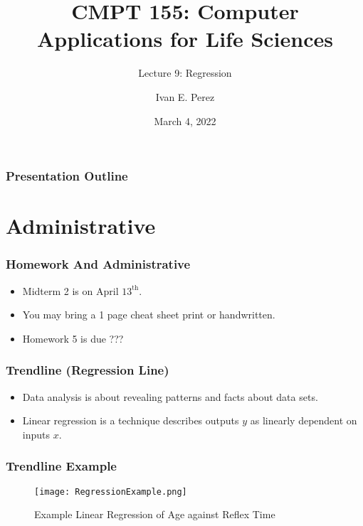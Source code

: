 \documentclass[12pt]{beamer}
\title{CMPT 155: Computer Applications for Life Sciences}
\subtitle{Lecture 9:  Regression}
\author{Ivan E. Perez}
\date{March 4, 2022}
\begin{document}
	
	\begin{frame}
		\titlepage
	\end{frame}
	
	\begin{frame}
		\frametitle{Presentation Outline}
		\tableofcontents
	\end{frame}
	\section{Administrative}
	\begin{frame}
		\frametitle{Homework And Administrative}
		\begin{itemize}
			\item Midterm 2 is on April $13^{\text{th}}$.
			\item You may bring a 1 page cheat sheet print or handwritten. 
			\item Homework 5 is due ???
		\end{itemize}
	\end{frame}
	\begin{frame}
		\frametitle{Trendline (Regression Line)}
		\begin{itemize}
			\item Data analysis is about revealing patterns and facts about data sets.
			\item Linear regression is a technique describes outputs $y$ as linearly dependent on inputs $x$.
		\end{itemize}
	\end{frame}
	
	\begin{frame}
		\frametitle{Trendline Example}
		\begin{center}
		\begin{figure}
		\texttt{[image: RegressionExample.png]}
		\caption{Example Linear Regression of Age against Reflex Time}
		\end{figure}
		\end{center}
	\end{frame}
\end{document}
